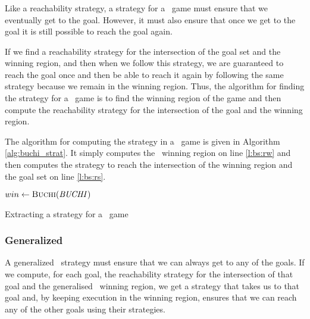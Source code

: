 \subsubsection{\buchi}

Like a reachability strategy, a strategy for a \buchi\ game must ensure that we eventually get to the goal. However, it must also ensure that once we get to the goal it is still possible to reach the goal again. 

If we find a reachability strategy for the intersection of the goal set and the winning region, and then when we follow this strategy, we are guaranteed to reach the goal once and then be able to reach it again by following the same strategy because we remain in the winning region.  Thus, the algorithm for finding the strategy for a \buchi\ game is to find the winning region of the game and then compute the reachability strategy for the intersection of the goal and the winning region.

The algorithm for computing the strategy in a \buchi\ game is given in Algorithm \ref{alg:buchi_strat}. It simply computes the \buchi\ winning region on line \ref{l:bs:rw} and then computes the strategy to reach the intersection of the winning region and the goal set on line \ref{l:bs:rs}.

\begin{algorithm}[t]
\begin{algorithmic}[1]

    \State $win \gets \Call{Buchi}{\buchiobj}$ \label{l:bs:rw}
    \State \Return {} \label{l:bs:rs}
\EndFunction

\end{algorithmic}
\caption{Extracting a strategy for a \buchi\ game}
\label{alg:buchi_strat}
\end{algorithm}

\subsubsection{Generalized \buchi}

A generalized \buchi\ strategy must ensure that we can always get to any of the goals. If we compute, for each goal, the reachability strategy for the intersection of that goal and the generalised \buchi\ winning region, we get a strategy that takes us to that goal and, by keeping execution in the winning region, ensures that we can reach any of the other goals using their strategies. 


